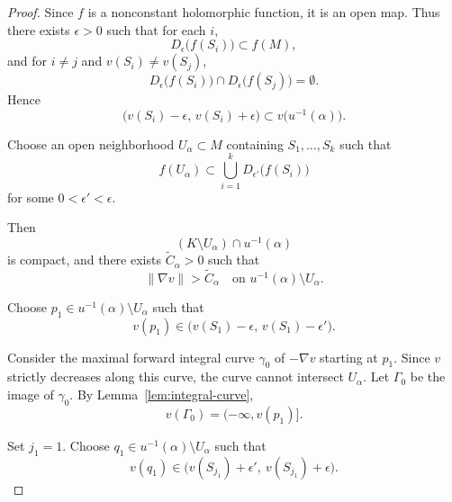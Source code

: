 \documentclass[11pt]{amsart}
\theoremstyle{plain}
\theoremstyle{definition}
\theoremstyle{remark}
\numberwithin{equation}{section}
\begin{document}
\begin{proof}
    Since $f$ is a nonconstant holomorphic function, it is an open map.
    Thus there exists $\epsilon > 0$ such that for each $i$,
    \begin{equation}
        D_\epsilon\big(f(S_i)\big) \subset f(M),
    \end{equation}
    and for $i \neq j$ and $v(S_i) \neq v(S_j)$,
    \begin{equation}
        D_\epsilon\big(f(S_i)\big) \cap D_\epsilon\big(f(S_j)\big) = \emptyset.
    \end{equation}
    Hence
    \begin{equation}
        \big(v(S_i) - \epsilon, \, v(S_i) + \epsilon\big) \subset v\big(u^{-1}(\alpha)\big).
    \end{equation}

    Choose an open neighborhood $U_\alpha \subset M$ containing $S_1, \ldots, S_k$ such that
    \begin{equation}
        f(U_\alpha) \subset \bigcup_{i=1}^{k} D_{\epsilon'}\big(f(S_i)\big)
    \end{equation}
    for some $0 < \epsilon' < \epsilon$.

    Then
    \begin{equation}
        (K \setminus U_\alpha) \cap u^{-1}(\alpha)
    \end{equation}
    is compact, and there exists $\widetilde{C}_\alpha > 0$ such that
    \begin{equation}
        \|\nabla v\| > \widetilde{C}_\alpha \quad \text{on } u^{-1}(\alpha) \setminus U_\alpha.
    \end{equation}

    Choose $p_1 \in u^{-1}(\alpha) \setminus U_\alpha$ such that
    \begin{equation}
        v(p_1) \in \big(v(S_1) - \epsilon, \, v(S_1) - \epsilon'\big).
    \end{equation}

    Consider the maximal forward integral curve $\gamma_0$ of $-\nabla v$ starting at $p_1$.
    Since $v$ strictly decreases along this curve, the curve cannot intersect $U_{\alpha}$.
    Let $\Gamma_0$ be the image of $\gamma_0$.
    By Lemma~\ref{lem:integral-curve},
    \begin{equation}
        v(\Gamma_0) = (-\infty, v(p_1)].
    \end{equation}

    Set $j_1 = 1$.
    Choose $q_1 \in u^{-1}(\alpha) \setminus U_{\alpha}$ such that
    \begin{equation}
        v(q_1) \in \bigl(v(S_{j_1}) + \epsilon', \ v(S_{j_1}) + \epsilon\bigr).
    \end{equation}


\end{proof}
\end{document}
